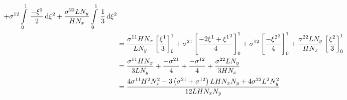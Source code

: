 \begin{equation}
\begin{aligned}
    +\conductivitytensorsymbol^{12}\gint{0}{1}{\dfrac{-\xitwo}{2}}{\xitwo}
    +\dfrac{\conductivitytensorsymbol^{22} L N_{y}}{H N_{x}}\gint{0}{1}{\dfrac{1}{3}}{\xitwo} \\
    &=\dfrac{\conductivitytensorsymbol^{11} H N_{x}}{L N_{y}}\sqbrac{\dfrac{\xione}{3}}^{1}_{0}
    +\conductivitytensorsymbol^{21}\sqbrac{\dfrac{-2\xione+\xionesq}{4}}^{1}_{0}
    +\conductivitytensorsymbol^{12}\sqbrac{\dfrac{-\xitwosq}{4}}^{1}_{0}
    +\dfrac{\conductivitytensorsymbol^{22} L N_{y}}{H N_{x}}\sqbrac{\dfrac{\xitwo}{3}}^{1}_{0} \\
    &=\dfrac{\conductivitytensorsymbol^{11} H N_{x}}{3 L N_{y}}+\dfrac{-\conductivitytensorsymbol^{21}}{4}+
    \dfrac{-\conductivitytensorsymbol^{12}}{4}+\dfrac{\conductivitytensorsymbol^{22} L N_{y}}{3 H N_{x}} \\
    &=\dfrac{4\conductivitytensorsymbol^{11}H^{2}N_{x}^{2}-3\pbrac{\conductivitytensorsymbol^{21}+
        \conductivitytensorsymbol^{12}}L H N_{x} N_{y}+4\conductivitytensorsymbol^{22}L^{2}N_{y}^{2}}{12 L H N_{x} N_{y}}
  \end{aligned}
\end{equation}

